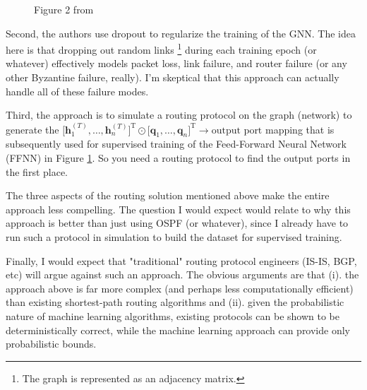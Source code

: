 \documentclass[11pt, oneside]{article}   	%
\begin{document}
\begin{figure}
\caption{Figure 2 from \cite{DBLP:conf/sigcomm/GeyerC18}}
\label{fig:figure2}
 \end{figure}


\bigskip
\noindent
Second, the authors use dropout \cite{Srivastava:2014:DSW:2627435.2670313}  to regularize the training of the GNN. The idea here is that dropping out random links \footnote{The graph
is represented as an adjacency matrix.} during each training epoch (or whatever) effectively models packet loss, link failure, and router failure (or any other Byzantine failure, really). I'm skeptical 
that this approach can actually handle all of these failure modes.

\bigskip
\noindent
Third, the approach is to simulate a routing protocol on the graph (network) to generate the $\big [ \mathbf{h}^{(T)}_1,\hdots, \mathbf{h}^{(T)}_n \Big ]^\text{T} \odot \big [ \mathbf{q}_1,\hdots, \mathbf{q}_n \big ]^\text{T} \to \text{output port}$ mapping that is subsequently  used for supervised training of the Feed-Forward Neural Network (FFNN) in Figure \ref{fig:figure2}. 
So you need a routing protocol to find the output ports in the first place.

\bigskip
\noindent
The three aspects of the routing solution mentioned above make the entire approach less compelling. The question I would expect would relate to why this approach is better than just using OSPF 
\cite{rfc2328} (or whatever), since I already have to run such a protocol in simulation to build the dataset for supervised training.


\bigskip
\noindent
Finally, I would expect that "traditional" routing protocol engineers (IS-IS, BGP, etc) will argue against such an approach. The obvious arguments are that (i). the approach above is far more complex (and perhaps
less computationally efficient)  than existing shortest-path routing algorithms and (ii). given the probabilistic nature of machine learning algorithms, existing protocols can be shown to be deterministically correct,
while the machine learning approach can provide only probabilistic bounds.
\end{document}
